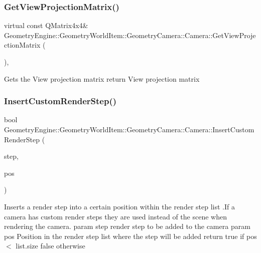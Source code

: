 \subsubsection{\texorpdfstring{GetViewProjectionMatrix()}{GetViewProjectionMatrix()}}
{\footnotesize\ttfamily virtual const Q\+Matrix4x4\& Geometry\+Engine\+::\+Geometry\+World\+Item\+::\+Geometry\+Camera\+::\+Camera\+::\+Get\+View\+Projection\+Matrix (\begin{DoxyParamCaption}{ }\end{DoxyParamCaption})\hspace{0.3cm}{\ttfamily [inline]}, {\ttfamily [virtual]}}

Gets the View projection matrix return View projection matrix \mbox{\label{class_geometry_engine_1_1_geometry_world_item_1_1_geometry_camera_1_1_camera_aff83b52805cc8085af8f0802ab554c11}} 
\subsubsection{\texorpdfstring{InsertCustomRenderStep()}{InsertCustomRenderStep()}}
{\footnotesize\ttfamily bool Geometry\+Engine\+::\+Geometry\+World\+Item\+::\+Geometry\+Camera\+::\+Camera\+::\+Insert\+Custom\+Render\+Step (\begin{DoxyParamCaption}\item[{const \mbox{\hyperlink{class_geometry_engine_1_1_geometry_render_step_1_1_render_step}{Geometry\+Render\+Step\+::\+Render\+Step}} \&}]{step,  }\item[{unsigned int}]{pos }\end{DoxyParamCaption})\hspace{0.3cm}{\ttfamily [virtual]}}

Inserts a render step into a certain position within the render step list .If a camera has custom render steps they are used instead of the scene when rendering the camera. param step render step to be added to the camera param pos Position in the render step list where the step will be added return true if pos $<$ list.\+size false otherwise \mbox{\label{class_geometry_engine_1_1_geometry_world_item_1_1_geometry_camera_1_1_camera_a6079f2bacb9134ca0c3d7e8a97993f8c}} 

